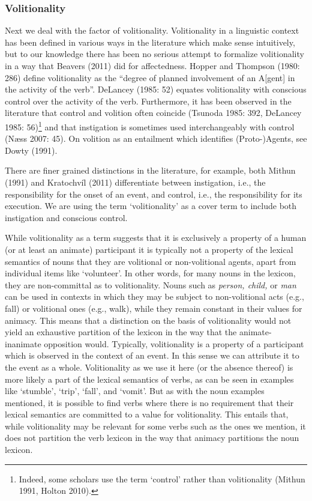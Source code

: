 \subsubsection[Volitionality]{\bfseries Volitionality}
Next we deal with the factor of volitionality. Volitionality in a linguistic context has been defined in various ways in the literature which make sense intuitively, but to our knowledge there has been no serious attempt to formalize volitionality in a way that Beavers (2011) did for affectedness. Hopper and Thompson (1980: 286) define volitionality as the {\textquotedblleft}degree of planned involvement of an A[gent] in the activity of the verb{\textquotedblright}. DeLancey (1985: 52) equates volitionality with conscious control over the activity of the verb. Furthermore, it has been observed in the literature that control and volition often coincide (Tsunoda 1985: 392, DeLancey 1985: 56)\footnote{Indeed, some scholars use the term {\textquoteleft}control{\textquoteright} rather than volitionality (Mithun 1991, Holton 2010).} and that instigation is sometimes used interchangeably with control (N{\ae}ss 2007: 45). On volition as an entailment which identifies (Proto-)Agents, see Dowty (1991).

There are finer grained distinctions in the literature, for example, both Mithun (1991) and Kratochv\'il (2011) differentiate between instigation, i.e., the responsibility for the onset of an event, and control, i.e., the responsibility for its execution. We are using the term {\textquoteleft}volitionality{\textquoteright} as a cover term to include both instigation and conscious control.

While volitionality as a term suggests that it is exclusively a property of a human (or at least an animate) participant it is typically not a property of the lexical semantics of nouns that they are volitional or non-volitional agents, apart from individual items like {\textquoteleft}volunteer{\textquoteright}. In other words, for many nouns in the lexicon, they are non-committal as to volitionality. Nouns such as \textit{person, child,} or \textit{man} can be used in contexts in which they may be subject to non-volitional acts (e.g., fall) or volitional ones (e.g., walk), while they remain constant in their values for animacy. This means that a distinction on the basis of volitionality would not yield an exhaustive partition of the lexicon in the way that the animate-inanimate opposition would. Typically, volitionality is a property of a participant which is observed in the context of an event. In this sense we can attribute it to the event as a whole. Volitionality as we use it here (or the absence 
thereof) is more likely a part of the lexical semantics of verbs, as can be seen in examples like {\textquoteleft}stumble{\textquoteright}, {\textquoteleft}trip{\textquoteright}, {\textquoteleft}fall{\textquoteright}, and {\textquoteleft}vomit{\textquoteright}. But as with the noun examples mentioned, it is possible to find verbs where there is no requirement that their lexical semantics are committed to a value for volitionality. This entails that, while volitionality may be relevant for some verbs such as the ones we mention, it does not partition the verb lexicon in the way that animacy partitions the noun lexicon.

